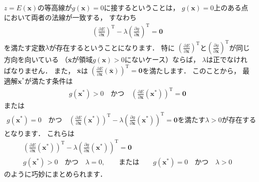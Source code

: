 ﻿\documentclass{jsarticle}
\begin{document}
$z=E(\boldsymbol{x})$の等高線が$g(\boldsymbol{x})=0$に接するということは，
$g(\boldsymbol{x})=0$上のある点において両者の法線が一致する，
すなわち
\begin{align*}
\left(\frac{\partial E}{\partial\boldsymbol{x}}\right)^{\mathrm{T}}-\lambda\left(\frac{\partial g}{\partial\boldsymbol{x}}\right)^{\mathrm{T}}=\boldsymbol{0}
\end{align*}
を満たす定数$\lambda$が存在するということになります．
特に
$\left(\frac{\partial E}{\partial\boldsymbol{x}}\right)^{\mathrm{T}}$と$\left(\frac{\partial g}{\partial\boldsymbol{x}}\right)^{\mathrm{T}}$が同じ方向を向いている
（$\bar{\boldsymbol{x}}$が領域$g(\boldsymbol{x})>0$にないケース）ならば，
$\lambda$は正でなければなりません．
また，
$\bar{\boldsymbol{x}}$は
$\left(\frac{\partial E}{\partial\boldsymbol{x}}(\bar{\boldsymbol{x}})\right)^{\mathrm{T}}=\boldsymbol{0}$を満たします．
このことから，
最適解$\boldsymbol{x}^{*}$が満たす条件は
\begin{align*}
g(\boldsymbol{x}^{*})>0 \quad\mbox{かつ}\quad
\left(\frac{\partial E}{\partial\boldsymbol{x}}(\boldsymbol{x}^{*})\right)^{\mathrm{T}}=\boldsymbol{0}
\end{align*}
または
\begin{align*}
g(\boldsymbol{x}^{*})=0 \quad\mbox{かつ}\quad
\left(\frac{\partial E}{\partial\boldsymbol{x}}(\boldsymbol{x}^{*})\right)^{\mathrm{T}}
-\lambda
\left(\frac{\partial g}{\partial\boldsymbol{x}}(\boldsymbol{x}^{*})\right)^{\mathrm{T}}
=\boldsymbol{0}
\mbox{を満たす$\lambda>0$が存在する}
\end{align*}
となります．
これらは
\begin{align*}
\left(\frac{\partial E}{\partial\boldsymbol{x}}(\boldsymbol{x}^{*})\right)^{\mathrm{T}}
-\lambda
\left(\frac{\partial g}{\partial\boldsymbol{x}}(\boldsymbol{x}^{*})\right)^{\mathrm{T}}
=\boldsymbol{0}
\\
g(\boldsymbol{x}^{*})>0 \quad\mbox{かつ}\quad \lambda=0,
\qquad\mbox{または}\qquad
g(\boldsymbol{x}^{*})=0 \quad\mbox{かつ}\quad \lambda>0
\end{align*}
のように巧妙にまとめられます．
\end{document}

